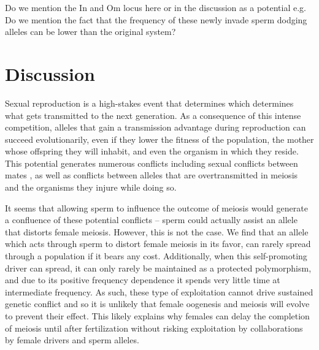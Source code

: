 \documentclass[12pt,letterpaper]{article}
\newcommand{\gc}[1]{{ \color{red} #1}}
\newcommand{\yb}[1]{{ \color{blue} #1}}
\begin{document}
\gc{Do we mention the In and Om locus here or in the discussion as a
	 potential e.g. Do we mention the fact that the frequency of these
	 newly invade sperm dodging alleles can be lower than the original system?}\\

\section*{Discussion}



Sexual reproduction is a high-stakes event that determines which
determines what gets transmitted to the next generation.  
As a consequence of this intense competition, alleles that gain a transmission advantage during reproduction 
	can succeed evolutionarily, even if they lower the 
        fitness of the population, 
	the mother whose offspring they will inhabit, 
	and even the organism in which they reside. 
This potential generates numerous conflicts  \cite{genesInConflict} including sexual conflicts between mates \cite{sexualConflict}, 
	as well as conflicts between alleles that are overtransmitted in meiosis and the organisms they injure while doing so.

It seems that allowing sperm to influence the outcome of meiosis would generate a confluence of these potential conflicts -- 
	sperm could actually assist an allele that distorts female meiosis.
However, this is not the case.
We find that an allele which acts through sperm to distort female meiosis in its favor, %
	can rarely spread through a population if it bears any cost. 
Additionally, when this self-promoting driver can spread, it can only
rarely 
be maintained as a protected polymorphism, and due to its positive frequency dependence 
	it spends very little time at intermediate frequency.
As such, these type of exploitation cannot drive sustained genetic conflict and so it is unlikely
	that female oogenesis and meiosis will evolve to prevent their effect.  
This likely explains why females can delay the completion of meiosis until after fertilization 
	without risking exploitation by collaborations by female
        drivers and sperm alleles.
\end{document}
